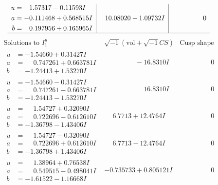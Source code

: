 \documentclass[1p]{elsarticle_modified}
\theoremstyle{definition}
\newcommand{\I}{\sqrt{-1}}
\begin{document}
$$\begin{array}{c|c|c}
\begin{aligned}
u &= \phantom{-}1.57317 - 0.11593 I \\
a &= -0.111468 + 0.568515 I \\
b &= \phantom{-}0.197956 + 0.165965 I\end{aligned}
 & \phantom{-}10.08020 - 1.09732 I & \phantom{-0.000000 } 0\\
 \hline 
 \end{array}$$\newpage$$\begin{array}{c|c|c}  
\text{Solutions to }I^u_{1}& \I (\text{vol} + \sqrt{-1}CS) & \text{Cusp shape}\\
 \hline 
\begin{aligned}
u &= -1.54660 + 0.31427 I \\
a &= \phantom{-}0.747261 + 0.663781 I \\
b &= -1.24413 + 1.53270 I\end{aligned}
 & \phantom{-0.000000 } -16.8310 I & \phantom{-0.000000 } 0 \\ \hline\begin{aligned}
u &= -1.54660 - 0.31427 I \\
a &= \phantom{-}0.747261 - 0.663781 I \\
b &= -1.24413 - 1.53270 I\end{aligned}
 & \phantom{-0.000000 -}16.8310 I & \phantom{-0.000000 } 0 \\ \hline\begin{aligned}
u &= \phantom{-}1.54727 + 0.32090 I \\
a &= \phantom{-}0.722696 - 0.612610 I \\
b &= -1.36798 - 1.43406 I\end{aligned}
 & \phantom{-}6.7713 + 12.4764 I & \phantom{-0.000000 } 0 \\ \hline\begin{aligned}
u &= \phantom{-}1.54727 - 0.32090 I \\
a &= \phantom{-}0.722696 + 0.612610 I \\
b &= -1.36798 + 1.43406 I\end{aligned}
 & \phantom{-}6.7713 - 12.4764 I & \phantom{-0.000000 } 0 \\ \hline\begin{aligned}
u &= \phantom{-}1.38964 + 0.76538 I \\
a &= \phantom{-}0.549515 - 0.498041 I \\
b &= -1.61522 - 1.16668 I\end{aligned}
 & -0.735733 + 0.805121 I & \phantom{-0.000000 } 0 \\ \hline\begin{aligned}

\end{aligned}
\end{array}$$
\end{document}
